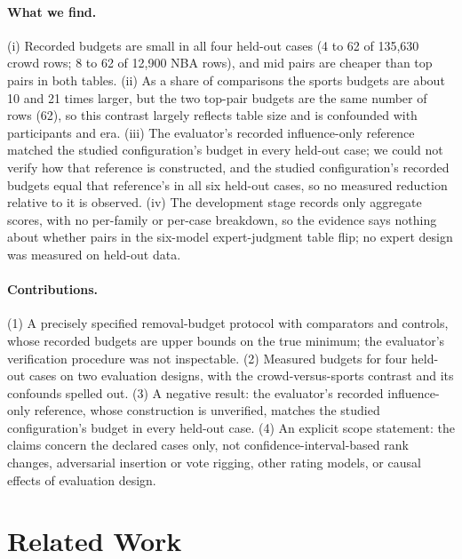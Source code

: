 \documentclass{article}
\begin{document}
\paragraph{What we find.} (i) Recorded budgets are small in all four held-out cases (4 to 62 of 135,630 crowd rows; 8 to 62 of 12,900 NBA rows), and mid pairs are cheaper than top pairs in both tables. (ii) As a share of comparisons the sports budgets are about 10 and 21 times larger, but the two top-pair budgets are the same number of rows (62), so this contrast largely reflects table size and is confounded with participants and era. (iii) The evaluator's recorded influence-only reference matched the studied configuration's budget in every held-out case; we could not verify how that reference is constructed, and the studied configuration's recorded budgets equal that reference's in all six held-out cases, so no measured reduction relative to it is observed. (iv) The development stage records only aggregate scores, with no per-family or per-case breakdown, so the evidence says nothing about whether pairs in the six-model expert-judgment table flip; no expert design was measured on held-out data.

\paragraph{Contributions.} (1) A precisely specified removal-budget protocol with comparators and controls, whose recorded budgets are upper bounds on the true minimum; the evaluator's verification procedure was not inspectable. (2) Measured budgets for four held-out cases on two evaluation designs, with the crowd-versus-sports contrast and its confounds spelled out. (3) A negative result: the evaluator's recorded influence-only reference, whose construction is unverified, matches the studied configuration's budget in every held-out case. (4) An explicit scope statement: the claims concern the declared cases only, not confidence-interval-based rank changes, adversarial insertion or vote rigging, other rating models, or causal effects of evaluation design.

\section{Related Work}
\end{document}
